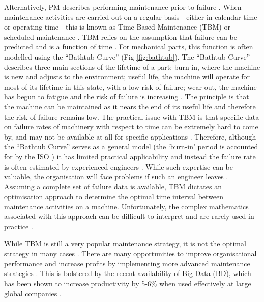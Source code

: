 Alternatively, PM describes performing maintenance prior to failure \cite{CBM_overview}.
When maintenance activities are carried out on a regular basis - either in calendar time or operating time - this is known as Time-Based Maintenance (TBM) or scheduled maintenance \cite{CBM_time_prevent}\cite{CM_practical_wind_turbine}.
TBM relies on the assumption that failure can be predicted and is a function of time \cite{CBM_time_prevent}\cite{CM_practical_wind_turbine}.
For mechanical parts, this function is often modelled using the ``Bathtub Curve'' \cite{CM_practical_wind_turbine} (Fig \ref{fig:bathtub}). 
The ``Bathtub Curve'' describes three main sections of the lifetime of a part: burn-in, where the machine is new and adjusts to the environment; useful life, the machine will operate for most of its lifetime in this state, with a low risk of failure; wear-out, the machine has begun to fatigue and the risk of failure is increasing \cite{CM_practical_wind_turbine}.
The principle is that the machine can be maintained as it nears the end of its useful life and therefore the risk of failure remains low.
The practical issue with TBM is that specific data on failure rates of machinery with respect to time can be extremely hard to come by, and may not be available at all for specific applications \cite{CBM_time_prevent}.
Therefore, although the ``Bathtub Curve'' serves as a general model (the `burn-in' period is accounted for by the ISO \cite{ISO17359}) it has limited practical applicability and instead the failure rate is often estimated by experienced engineers \cite{CBM_time_prevent}.
While such expertise can be valuable, the organisation will face problems if such an engineer leaves \cite{CBM_time_prevent}.
Assuming a complete set of failure data is available, TBM dictates an optimisation approach to determine the optimal time interval between maintenance activities on a machine.
Unfortunately, the complex mathematics associated with this approach can be difficult to interpret and are rarely used in practice \cite{CBM_time_prevent}.
\par

While TBM is still a very popular maintenance strategy, it is not the optimal strategy in many cases \cite{CBM_overview}.
There are many opportunities to improve organisational performance and increase profits by implementing more advanced maintenance strategies \cite{CBM_shipping_opportunity}.
This is bolstered by the recent availability of Big Data (BD), which has been shown to increase productivity by 5-6\% when used effectively at large global companies \cite{CBM_norway_bd}.


